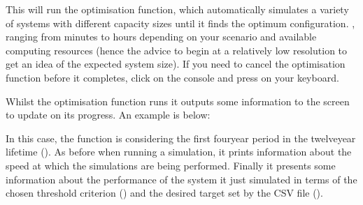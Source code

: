 \documentclass[letterpaper,10pt,english]{sphinxmanual}
\begin{document}
\begin{sphinxVerbatim}[commandchars=\\\{\}]
  
\end{sphinxVerbatim}

\sphinxAtStartPar
This will run the optimisation function, which automatically simulates a
variety of systems with different capacity sizes until it finds the
optimum configuration. , ranging from minutes to hours depending on your scenario
and available computing resources (hence the advice to begin at a
relatively low resolution to get an idea of the expected system size).
If you need to cancel the optimisation function before it completes,
click on the console and press  on your keyboard.

\sphinxAtStartPar
Whilst the optimisation function runs it outputs some information to the
screen to update on its progress. An example is below:

\begin{sphinxVerbatim}[commandchars=\\\{\}]
   

       

       
\end{sphinxVerbatim}

\sphinxAtStartPar
In this case, the function is considering the first four\sphinxhyphen{}year period in
the twelve\sphinxhyphen{}year lifetime (). As before when running a
simulation, it prints information about the speed at which the
simulations are being performed. Finally it presents some information
about the performance of the system it just simulated in terms of the
chosen threshold criterion () and the desired target
set by the  CSV file ().
\end{document}
